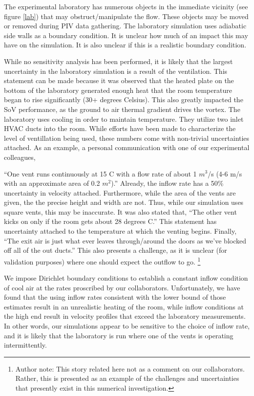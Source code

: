\documentclass{article}
\begin{document}
The experimental laboratory has numerous objects
in the immediate vicinity (see figure \ref{lab}) that may
obstruct/manipulate the flow. These objects may be moved or removed
during PIV data gathering. The laboratory simulation uses adiabatic side
walls as a boundary condition. It is unclear how much of an impact this
may have on the simulation. It is also unclear if this is a realistic
boundary condition. 

While no sensitivity analysis has been performed, it is likely that the
largest uncertainty in the laboratory simulation is a result of the
ventilation. This statement can be made because it was observed that the
heated plate on the bottom of the laboratory generated enough heat that
the room temperature began to rise significantly (30+ degrees
Celsius). This also greatly impacted the SoV performance, as the ground
to air thermal gradient drives the vortex. The laboratory uses cooling
in order to maintain temperature. They utilize two inlet HVAC ducts into
the room. While efforts have been made to characterize the level of
ventillation being used, these numbers come with non-trivial
uncertainties attached. As an example, a personal communication with one
of our experimental colleagues, 

``One vent runs continuously at 15 C with a flow rate of about 1
$m^3$/s (4-6 m/s with an approximate area of 0.2 $m^2$).''
Already, the inflow rate has a 50\% uncertainty in velocity
attached. Furthermore, while the area of the vents are given, the the
precise height and width are not. Thus, while our simulation uses square
vents, this may be inaccurate. 
It was also stated that, ``The other vent kicks on only if the
room gets about 28 degrees C.'' This statement has uncertainty attached to the
temperature at which the venting begins. Finally, ``The exit air is just
what ever leaves through/around the doors as we've blocked off all of
the out ducts.'' This also presents a challenge, as it is unclear (for
validation purposes) where one should expect the outflow to
go. \footnote{\normalsize Author note: This story related here not as a comment on
our collaborators. Rather, this is presented as an example of the challenges
and uncertainties that presently exist in this numerical investigation.}

We impose Dirichlet boundary conditions to establish a constant inflow
condition of cool air at the rates proscribed by our
collaborators. Unfortunately, we have found that the using inflow rates
consistent with the lower bound of those estimates result in an
unrealistic heating of the room, while inflow conditions at the high end
result in velocity profiles that exceed the laboratory measurements. In
other words, our simulations appear to be sensitive to the choice of
inflow rate, and it is likely that the laboratory is run where one of
the vents is operating intermittently. 
\end{document}
